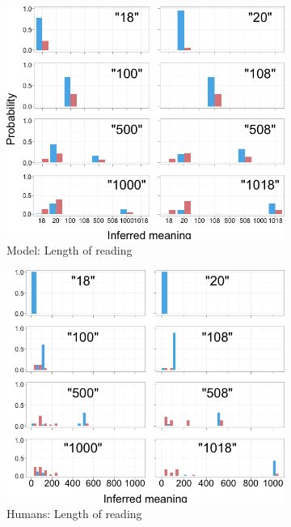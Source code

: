 \documentclass{article} %
\begin{document}
\begin{figure}[t]
        \qquad
        
       
       \begin{subfigure}[b]{0.51\textwidth}
                \centering
                \caption{Model: Length of reading}
                \includegraphics[width=\textwidth]{model_reading_all.png}
	\end{subfigure}
        \begin{subfigure}[b]{0.51\textwidth}
                \centering       
                \caption{Humans: Length of reading}         
                \includegraphics[width=\textwidth]{humans_reading_all.png}
        \end{subfigure} 
        \caption{}\end{figure}



\clearpage

\small{

}
\end{document}
